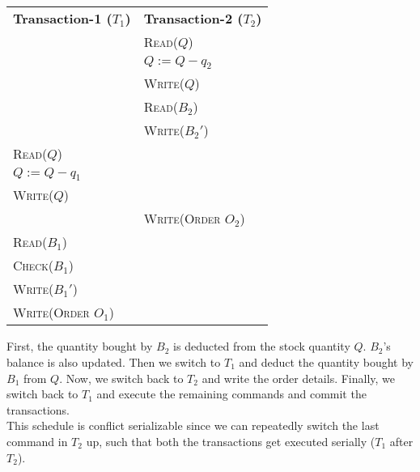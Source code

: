 \begin{center}
    \begin{adjustbox}{width=\textwidth}
        \begin{tabularx}{\textwidth}{|X|X|}
        \hline
        \multirow{2}{*}{\textbf{Transaction-1 ($T_{1}$)}} & \multirow{2}{*}{\textbf{Transaction-2 ($T_{2}$)}} \\
        & \\ \hline
        & \textsc{Read($Q$)} \\
        & \textsc{$Q := Q - q_{2}$} \\
        & \textsc{Write($Q$)} \\
        & \textsc{Read($B_{2}$)} \\
        & \textsc{Write($B_{2}'$)} \\
        \textsc{Read($Q$)} & \\
        \textsc{$Q := Q - q_{1}$} & \\
        \textsc{Write($Q$)} & \\
        & \textsc{Write(Order $O_{2}$)} \\
        \textsc{Read($B_{1}$)} & \\
        \textsc{Check($B_{1}$)} & \\
        \textsc{Write($B_{1}'$)} & \\
        \textsc{Write(Order $O_{1}$)} & \\
        \hline
        \end{tabularx}
    \end{adjustbox}
\end{center}
\vspace*{10pt}
First, the quantity bought by $B_{2}$ is deducted from the stock quantity $Q$. $B_{2}$'s balance is also updated.
Then we switch to $T_{1}$ and deduct the quantity bought by $B_{1}$ from $Q$. Now, we switch back to $T_{2}$ and write the order details.
Finally, we switch back to $T_{1}$ and execute the remaining commands and commit the transactions.
\vspace*{10pt} \\
This schedule is conflict serializable since we can repeatedly switch the last command in $T_{2}$ up, such that both the transactions
get executed serially ($T_{1}$ after $T_{2}$).